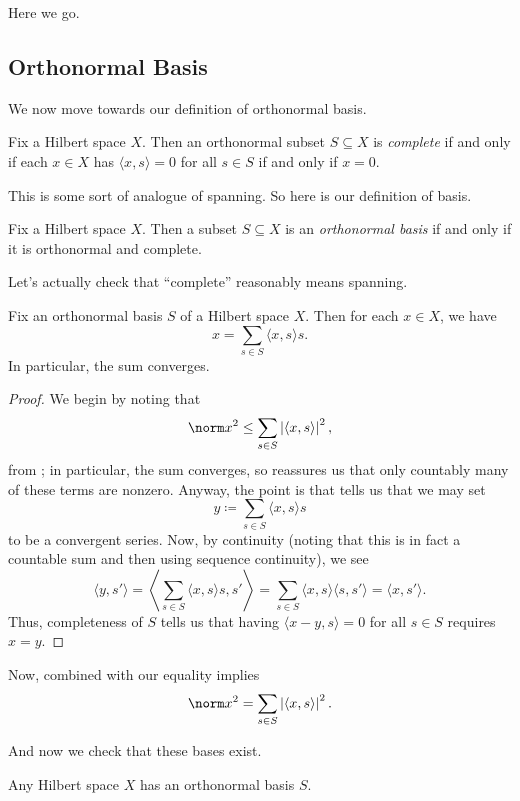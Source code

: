 \documentclass[../notes.tex]{subfiles}
\begin{document}
Here we go.

\subsection{Orthonormal Basis}
We now move towards our definition of orthonormal basis.
\begin{definition}[complete]
	Fix a Hilbert space $X$. Then an orthonormal subset $S\subseteq X$ is \textit{complete} if and only if each $x\in X$ has $\langle x,s\rangle=0$ for all $s\in S$ if and only if $x=0$.
\end{definition}
This is some sort of analogue of spanning. So here is our definition of basis.
\begin{definition}
	Fix a Hilbert space $X$. Then a subset $S\subseteq X$ is an \textit{orthonormal basis} if and only if it is orthonormal and complete.
\end{definition}
Let's actually check that ``complete'' reasonably means spanning.
\begin{lemma}
	Fix an orthonormal basis $S$ of a Hilbert space $X$. Then for each $x\in X$, we have
	\[x=\sum_{s\in S}\langle x,s\rangle s.\]
	In particular, the sum converges.
\end{lemma}
\begin{proof}
	We begin by noting that
	\[\norm x^2\le\sum_{s\in S}\left|\langle x,s\rangle\right|^2,\]
	from ; in particular, the sum converges, so  reassures us that only countably many of these terms are nonzero. Anyway, the point is that  tells us that we may set
	\[y\coloneqq\sum_{s\in S}\langle x,s\rangle s\]
	to be a convergent series. Now, by continuity (noting that this is in fact a countable sum and then using sequence continuity), we see
	\[\langle y,s'\rangle=\left\langle\sum_{s\in S}\langle x,s\rangle s,s'\right\rangle=\sum_{s\in S}\langle x,s\rangle\langle s,s'\rangle=\langle x,s'\rangle.\]
	Thus, completeness of $S$ tells us that having $\langle x-y,s\rangle=0$ for all $s\in S$ requires $x=y$.
\end{proof}
\begin{remark}
	Now,  combined with our equality implies
	\[\norm x^2=\sum_{s\in S}\left|\langle x,s\rangle\right|^2.\]
\end{remark}
And now we check that these bases exist.
\begin{theorem} \label{thm:hilb-has-ortho-basis}
	Any Hilbert space $X$ has an orthonormal basis $S$.
\end{theorem}
\end{document}
